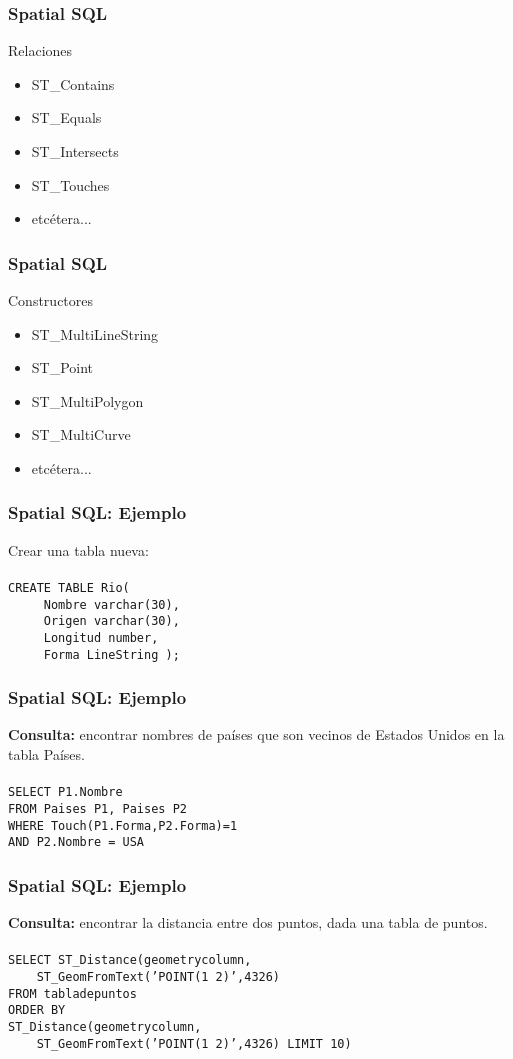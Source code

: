 \documentclass[12pt]{beamer}
\begin{document}
\begin{frame}
\frametitle{Spatial SQL}
Relaciones
\begin{itemize}
\item ST\_Contains
\item ST\_Equals
\item ST\_Intersects
\item ST\_Touches
\item etc\'etera...
\end{itemize}

\end{frame}

\begin{frame}
\frametitle{Spatial SQL}
Constructores
\begin{itemize}
\item ST\_MultiLineString
\item ST\_Point
\item ST\_MultiPolygon
\item ST\_MultiCurve
\item etc\'etera...
\end{itemize}
\end{frame}

\begin{frame}
\frametitle{Spatial SQL: Ejemplo}
Crear una tabla nueva:\\
\ \\
\texttt{CREATE TABLE Rio(\\
\ \ \ \ \ Nombre varchar(30),\\
\ \ \ \ \ Origen varchar(30),\\
\ \ \ \ \ Longitud number,\\
\ \ \ \ \ Forma LineString );}
\end{frame}

\begin{frame}
\frametitle{Spatial SQL: Ejemplo}
\textbf{Consulta:} encontrar nombres de pa\'ises que son vecinos de Estados Unidos en la tabla Pa\'ises.\\
\ \\
\texttt{SELECT P1.Nombre\\
FROM Paises P1, Paises P2\\
WHERE Touch(P1.Forma,P2.Forma)=1\\
AND P2.Nombre = USA} 
\end{frame}

\begin{frame}
\frametitle{Spatial SQL: Ejemplo}
\textbf{Consulta:} encontrar la distancia entre dos puntos, dada una tabla de puntos.\\
\ \\
\texttt{SELECT ST\_Distance(geometrycolumn,\\
\ \ \ \ ST\_GeomFromText('POINT(1 2)',4326)\\
FROM tabladepuntos\\
ORDER BY\\
ST\_Distance(geometrycolumn,\\
\ \ \ \ ST\_GeomFromText('POINT(1 2)',4326) LIMIT 10)}
\end{frame}
\end{document}
